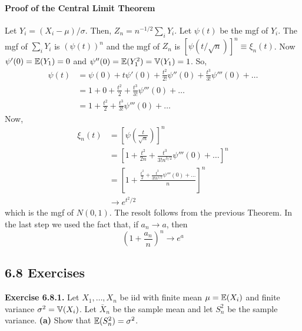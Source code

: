 \paragraph{Proof of the Central Limit
Theorem}\label{proof-of-the-central-limit-Theorem}
Let \(Y_{i} = (X_{i} - \mu) / \sigma\). Then, \(Z_{n} = n^{-1/2} \sum_{i} Y_{i}\).
Let \(\psi(t)\) be the mgf of \(Y_{i}\). The mgf of \(\sum_{i} Y_{i}\) is
\((\psi(t))^{n}\) and the mgf of \(Z_{n}\) is
\([\psi(t / \sqrt{n})]^{n} \equiv \xi_{n}(t)\).
Now \(\psi'(0) = \operatorname{\mathbb{E}}(Y_{1}) = 0\) and
\(\psi''(0) = \operatorname{\mathbb{E}}(Y_{1}^{2}) = \operatorname{\mathbb{V}}(Y_{1}) = 1\). So,
\begin{align*}
\psi(t) & = \psi(0) + t \psi'(0) + \frac{t^{2}}{2!} \psi''(0) + \frac{t^{3}}{3!} \psi'''(0) + \dots \\
        & = 1 + 0 + \frac{t^{2}}{2} +  \frac{t^{3}}{3!} \psi'''(0) + \ldots \\
        & = 1 + \frac{t^{2}}{2} +  \frac{t^{3}}{3!} \psi'''(0) + \ldots
\end{align*}
Now,
\begin{align*}
\xi_{n}(t) & = \left[ \psi \left( \frac{t}{\sqrt{n}} \right) \right] ^{n} \\
         & = \left[  1 + \frac{t^{2}}{2n} +  \frac{t^{3}}{3!n^{3/2}} \psi'''(0) + \ldots \right] ^{n} \\
         & = \left[  1 + \frac{\frac{t^{2}}{2} +  \frac{t^{3}}{3!n^{1/2}} \psi'''(0) + \ldots}{n} \right] ^{n} \\
         & \rightarrow e^{t^{2}/2}
\end{align*}
which is the mgf of \(N(0, 1)\). The resolt follows from the previous
Theorem. In the last step we used the fact that, if
\(a_{n} \rightarrow a\), then
\[
\left( 1 + \frac{a_{n}}{n} \right) ^{n} \rightarrow e^{a}
\]

\subsection*{6.8 Exercises}

\textbf{Exercise 6.8.1.} Let \(X_{1}, \dots, X_{n}\) be iid with finite mean
\(\mu = \operatorname{\mathbb{E}}(X_{i})\) and finite variance
\(\sigma^{2} = \operatorname{\mathbb{V}}(X_{i})\). Let \(\bar{X}_{n}\) be the sample
mean and let \(S_{n}^{2}\) be the sample variance.
\textbf{(a)} Show that \(\operatorname{\mathbb{E}}(S_{n}^{2}) = \sigma^{2}\).

